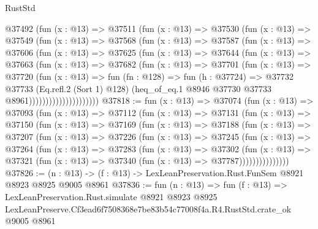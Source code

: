\begin{lexlean}{RustStd}
\begin{coremodule}
                @37492
                  (fun (x : @13) =>
                  @37511
                    (fun (x : @13) =>
                    @37530
                      (fun (x : @13) =>
                      @37549
                        (fun (x : @13) =>
                        @37568
                          (fun (x : @13) =>
                          @37587
                            (fun (x : @13) =>
                            @37606
                              (fun (x : @13) =>
                              @37625
                                (fun (x : @13) =>
                                @37644
                                  (fun (x : @13) =>
                                  @37663
                                    (fun (x : @13) =>
                                    @37682
                                      (fun (x : @13) =>
                                      @37701
                                        (fun (x : @13) =>
                                        @37720
                                          (fun (x : @13) =>
                                          fun (fn : @128) =>
                                          fun (h : @37724) =>
                                          @37732
                                            @37733
                                            (Eq.refl.{2} (Sort 1) @128)
                                            (heq_of_eq.{1}
                                              @8946
                                              @37730
                                              @37733
                                              @8961)))))))))))))))))))))
@37818 := fun (x : @13) =>
  @37074
    (fun (x : @13) =>
    @37093
      (fun (x : @13) =>
      @37112
        (fun (x : @13) =>
        @37131
          (fun (x : @13) =>
          @37150
            (fun (x : @13) =>
            @37169
              (fun (x : @13) =>
              @37188
                (fun (x : @13) =>
                @37207
                  (fun (x : @13) =>
                  @37226
                    (fun (x : @13) =>
                    @37245
                      (fun (x : @13) =>
                      @37264
                        (fun (x : @13) =>
                        @37283
                          (fun (x : @13) =>
                          @37302
                            (fun (x : @13) =>
                            @37321 (fun (x : @13) => @37340 (fun (x : @13) => @37787)))))))))))))))
@37826 := (n : @13) -> (f : @13) -> LexLeanPreservation.Rust.FunSem @8921 @8923 @8925 @9005 @8961
@37836 := fun (n : @13) =>
  fun (f : @13) =>
  LexLeanPreservation.Rust.simulate
    @8921
    @8923
    @8925
    LexLeanPreserve.Cf3ead6f7508368e7be83b54c77008f4a.R4.RustStd.crate_ok
    @9005
    @8961
\end{coremodule}
\end{lexlean}
